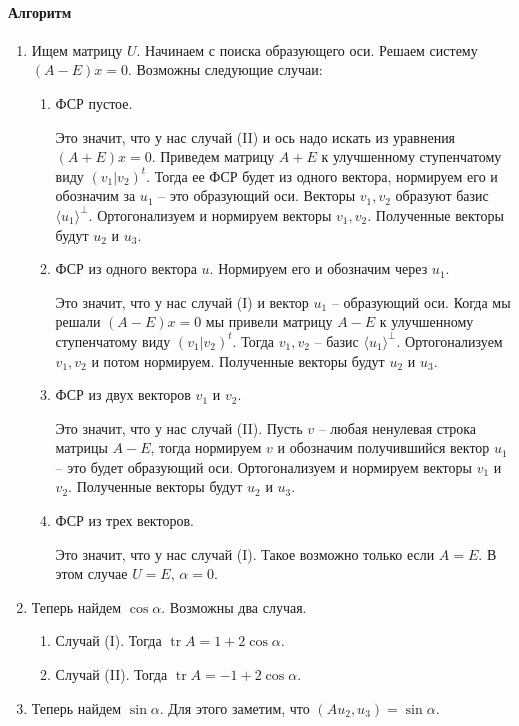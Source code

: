 \documentclass{article}
\newcommand{\tr}{\mathop{\mathrm{tr}}}
\begin{document}
\paragraph{Алгоритм}
\begin{enumerate}
\item Ищем матрицу $U$. Начинаем с поиска образующего оси. Решаем систему $(A - E)x = 0$. Возможны следующие случаи:
\begin{enumerate}
\item ФСР пустое.

Это значит, что у нас случай (II) и ось надо искать из уравнения $(A+E)x = 0$. Приведем матрицу $A+E$ к улучшенному ступенчатому виду $(v_1|v_2)^t$. Тогда ее ФСР будет из одного вектора, нормируем его и обозначим за $u_1$ -- это образующий оси. Векторы $v_1, v_2$ образуют базис $\langle u_1\rangle^\bot$. Ортогонализуем и нормируем векторы $v_1,v_2$. Полученные векторы будут $u_2$ и $u_3$.

\item ФСР из одного вектора $u$. Нормируем его и обозначим через $u_1$.

Это значит, что у нас случай (I) и вектор $u_1$ -- образующий оси. Когда мы решали $(A-E)x = 0$ мы привели матрицу $A-E$ к улучшенному ступенчатому виду $(v_1|v_2)^t$. Тогда $v_1,v_2$ -- базис  $\langle u_1\rangle^\bot$. Ортогонализуем $v_1,v_2$ и потом нормируем. Полученные векторы будут $u_2$ и $u_3$.

\item ФСР из двух векторов $v_1$ и $v_2$.

Это значит, что у нас случай (II). Пусть $v$ -- любая ненулевая строка матрицы $A-E$, тогда нормируем $v$ и обозначим получившийся вектор $u_1$ -- это будет образующий оси. Ортогонализуем и нормируем векторы $v_1$ и $v_2$. Полученные векторы будут $u_2$ и $u_3$.

\item ФСР из трех векторов. 

Это значит, что у нас случай (I). Такое возможно только если $A = E$. В этом случае $U= E$, $\alpha = 0$. 
\end{enumerate}

\item Теперь найдем $\cos \alpha$. Возможны два случая.
\begin{enumerate}
\item Случай (I). Тогда $\tr A = 1 + 2 \cos \alpha$.
\item Случай (II). Тогда $\tr A = -1 + 2 \cos \alpha$.
\end{enumerate}

\item Теперь найдем $\sin \alpha$. Для этого заметим, что $(Au_2, u_3) = \sin \alpha$.

\end{enumerate}
\end{document}
